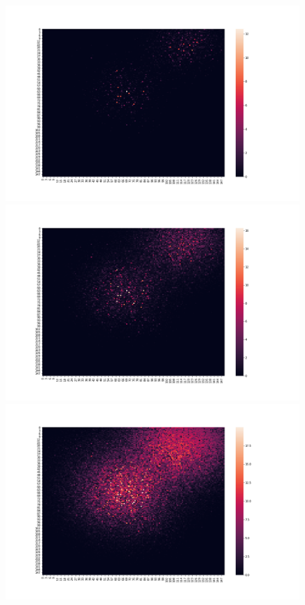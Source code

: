 \documentclass[a4paper]{article}
\begin{document}
\begin{figure}[ht]
  \centering
  \includegraphics[scale=0.14]{../gaussian_spread/gaussian_spread_3.png}
  \centering
  \includegraphics[scale=0.14]{../gaussian_spread/gaussian_spread_4.png}
  \centering
  \includegraphics[scale=0.14]{../gaussian_spread/gaussian_spread_5.png}

\end{figure}
\end{document}
